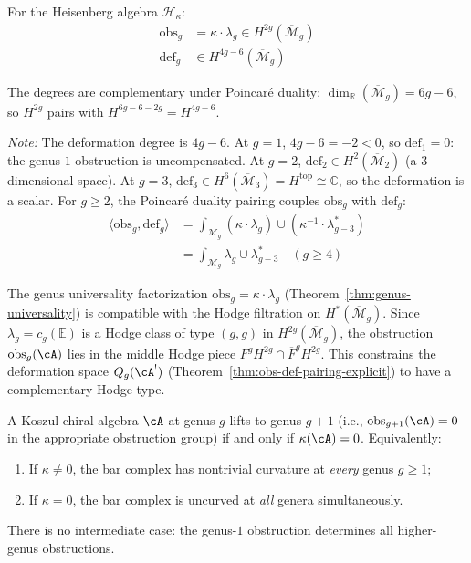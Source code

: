 \begin{example}\label{ex:heisenberg-pairing}
For the Heisenberg algebra $\mathcal{H}_\kappa$:
\begin{align}
\text{obs}_g &= \kappa \cdot \lambda_g \in H^{2g}(\overline{\mathcal{M}}_g) \\
\text{def}_g &\in H^{4g-6}(\overline{\mathcal{M}}_g)
\end{align}

The degrees are complementary under Poincar\'e duality: $\dim_{\mathbb{R}}(\overline{\mathcal{M}}_g) = 6g - 6$, so $H^{2g}$ pairs with $H^{6g-6-2g} = H^{4g-6}$.

\emph{Note:} The deformation degree is $4g - 6$.
At $g = 1$, $4g - 6 = -2 < 0$, so $\text{def}_1 = 0$:
the genus-$1$ obstruction is uncompensated.
At $g = 2$, $\text{def}_2 \in H^2(\overline{\mathcal{M}}_2)$
(a $3$-dimensional space).
At $g = 3$, $\text{def}_3 \in H^6(\overline{\mathcal{M}}_3) = H^{\mathrm{top}} \cong \mathbb{C}$, so the deformation is a scalar.
For $g \geq 2$, the Poincar\'e duality pairing couples
$\text{obs}_g$ with $\text{def}_g$:
\begin{align}
\langle \text{obs}_g, \text{def}_g \rangle &= \int_{\mathcal{M}_g} (\kappa \cdot \lambda_g)
\cup (\kappa^{-1} \cdot \lambda_{g-3}^*) \\
&= \int_{\mathcal{M}_g} \lambda_g \cup \lambda_{g-3}^* \quad (g \geq 4)
\end{align}
\end{example}

\begin{remark}\label{rem:hodge-filtration}
The genus universality factorization $\mathrm{obs}_g = \kappa \cdot \lambda_g$ (Theorem~\ref{thm:genus-universality}) is compatible with the Hodge filtration on $H^*(\overline{\mathcal{M}}_g)$.  Since $\lambda_g = c_g(\mathbb{E})$ is a Hodge class of type $(g,g)$ in $H^{2g}(\overline{\mathcal{M}}_g)$, the obstruction $\mathrm{obs}_g(\cA)$ lies in the middle Hodge piece $F^g H^{2g} \cap \overline{F}^g H^{2g}$.  This constrains the deformation space $Q_g(\cA^!)$ (Theorem~\ref{thm:obs-def-pairing-explicit}) to have a complementary Hodge type.
\end{remark}

\begin{proposition}
\label{prop:obstruction-lifting}
A Koszul chiral algebra $\cA$ at genus $g$ lifts to genus $g+1$ (i.e., $\mathrm{obs}_{g+1}(\cA) = 0$ in the appropriate obstruction group) if and only if $\kappa(\cA) = 0$.  Equivalently:
\begin{enumerate}[label=\textup{(\roman*)}]
\item If $\kappa \neq 0$, the bar complex has nontrivial curvature at \emph{every} genus $g \geq 1$;
\item If $\kappa = 0$, the bar complex is uncurved at \emph{all} genera simultaneously.
\end{enumerate}
There is no intermediate case: the genus-$1$ obstruction determines all higher-genus obstructions.
\end{proposition}

